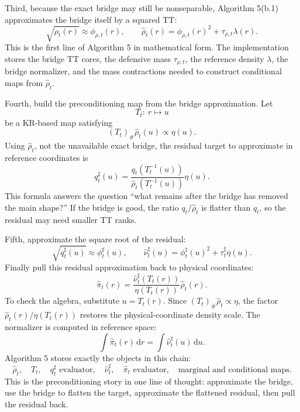 \documentclass[11pt]{article}
\newcommand{\dd}{\,\mathrm d}
\begin{document}
Third, because the exact bridge may still be nonseparable, Algorithm 5(b.1)
approximates the bridge itself by a squared TT:
\[
    \sqrt{\rho_t(r)}\approx \phi_{\rho,t}(r),
    \qquad
    \widehat\rho_t(r)
    =
    \phi_{\rho,t}(r)^2+\tau_{\rho,t}\lambda(r).
    \label{eq:p24-p7b}
\]
This is the first line of Algorithm 5 in mathematical form.  The implementation
stores the bridge TT cores, the defensive mass \(\tau_{\rho,t}\), the reference
density \(\lambda\), the bridge normalizer, and the mass contractions needed to
construct conditional maps from \(\widehat\rho_t\).

Fourth, build the preconditioning map from the bridge approximation.  Let
\[
    T_t:\ r\mapsto u
    \label{eq:p24-p7c}
\]
be a KR-based map satisfying
\[
    (T_t)_\#\widehat\rho_t(u)\propto \eta(u).
    \label{eq:p24-p7d}
\]
Using \(\widehat\rho_t\), not the unavailable exact bridge, the residual target
to approximate in reference coordinates is
\[
    q_t^\sharp(u)
    =
    \frac{q_t(T_t^{-1}(u))}
    {\widehat\rho_t(T_t^{-1}(u))}
    \eta(u).
    \label{eq:p24-p7e}
\]
This formula answers the question ``what remains after the bridge has removed
the main shape?''  If the bridge is good, the ratio \(q_t/\widehat\rho_t\) is
flatter than \(q_t\), so the residual may need smaller TT ranks.

Fifth, approximate the square root of the residual:
\[
    \sqrt{q_t^\sharp(u)}\approx \phi_t^\sharp(u),
    \qquad
    \widehat\nu_t^\sharp(u)
    =
    \phi_t^\sharp(u)^2+\tau_t^\sharp\eta(u).
    \label{eq:p24-p7f}
\]
Finally pull this residual approximation back to physical coordinates:
\[
    \widehat\pi_t(r)
    =
    \frac{\widehat\nu_t^\sharp(T_t(r))}
    {\eta(T_t(r))}
    \widehat\rho_t(r).
    \label{eq:p24-p7g}
\]
To check the algebra, substitute \(u=T_t(r)\).  Since
\((T_t)_\#\widehat\rho_t\propto\eta\), the factor
\(\widehat\rho_t(r)/\eta(T_t(r))\) restores the physical-coordinate density
scale.  The normalizer is computed in reference space:
\[
    \int \widehat\pi_t(r)\dd r
    =
    \int \widehat\nu_t^\sharp(u)\dd u.
    \label{eq:p24-p7h}
\]
Algorithm 5 stores exactly the objects in this chain:
\[
    \widehat\rho_t,\quad T_t,\quad q_t^\sharp\text{ evaluator},\quad
    \widehat\nu_t^\sharp,\quad \widehat\pi_t\text{ evaluator},\quad
    \text{marginal and conditional maps}.
    \label{eq:p24-p7i}
\]
This is the preconditioning story in one line of thought: approximate the
bridge, use the bridge to flatten the target, approximate the flattened
residual, then pull the residual back.
\end{document}
